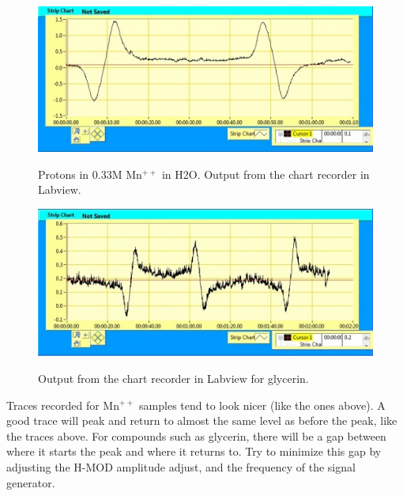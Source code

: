 \documentclass{../lab}
\begin{document}
\begin{figure}[h]
\begin{minipage}{0.49\textwidth}
    \href{http://experimentationlab.berkeley.edu/sites/default/files/images/500px-0_33MMnchart.jpg}{\includegraphics[width=\linewidth,keepaspectratio]{images/500px-0_33MMnchart.jpg}}
    \caption{Protons in 0.33M Mn$^{++}$ in H2O. Output from the chart recorder in Labview.}
    \label{fig:OutputFor33Molar}
\end{minipage}\hfill
\begin{minipage}{0.49\textwidth}
    \href{http://experimentationlab.berkeley.edu/sites/default/files/images/500px-Glycerinchart.jpg}{\includegraphics[width=\linewidth,keepaspectratio]{images/500px-Glycerinchart.jpg}}
    \caption{Output from the chart recorder in Labview for glycerin.}
    \label{fig:OutputForGlycerin}
\end{minipage}
\end{figure}



Traces recorded for Mn$^{++}$ samples tend to look nicer (like the ones above). A good trace will peak and return to almost the same level as before the peak, like the traces above. For compounds such as glycerin, there will be a gap between where it starts the peak and where it returns to. Try to minimize this gap by adjusting the H-MOD amplitude adjust, and the frequency of the signal generator.
\end{document}
